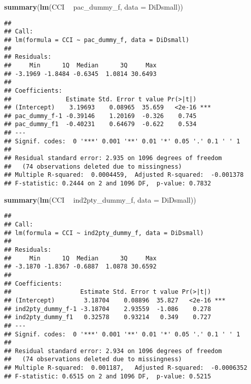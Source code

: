 \documentclass[]{article}
\newenvironment{Shaded}{\begin{snugshade}}{\end{snugshade}}
\newcommand{\KeywordTok}[1]{\textcolor[rgb]{0.13,0.29,0.53}{\textbf{#1}}}
\newcommand{\DataTypeTok}[1]{\textcolor[rgb]{0.13,0.29,0.53}{#1}}
\newcommand{\StringTok}[1]{\textcolor[rgb]{0.31,0.60,0.02}{#1}}
\newcommand{\OperatorTok}[1]{\textcolor[rgb]{0.81,0.36,0.00}{\textbf{#1}}}
\newcommand{\NormalTok}[1]{#1}
\begin{document}
\begin{Shaded}
\begin{Highlighting}[]
\KeywordTok{summary}\NormalTok{(}\KeywordTok{lm}\NormalTok{(CCI }\OperatorTok{~}\StringTok{ }\NormalTok{pac_dummy_f, }\DataTypeTok{data =}\NormalTok{ DiDsmall))}
\end{Highlighting}
\end{Shaded}

\begin{verbatim}
## 
## Call:
## lm(formula = CCI ~ pac_dummy_f, data = DiDsmall)
## 
## Residuals:
##     Min      1Q  Median      3Q     Max 
## -3.1969 -1.8484 -0.6345  1.0814 30.6493 
## 
## Coefficients:
##               Estimate Std. Error t value Pr(>|t|)    
## (Intercept)    3.19693    0.08965  35.659   <2e-16 ***
## pac_dummy_f-1 -0.39146    1.20169  -0.326    0.745    
## pac_dummy_f1  -0.40231    0.64679  -0.622    0.534    
## ---
## Signif. codes:  0 '***' 0.001 '**' 0.01 '*' 0.05 '.' 0.1 ' ' 1
## 
## Residual standard error: 2.935 on 1096 degrees of freedom
##   (74 observations deleted due to missingness)
## Multiple R-squared:  0.0004459,  Adjusted R-squared:  -0.001378 
## F-statistic: 0.2444 on 2 and 1096 DF,  p-value: 0.7832
\end{verbatim}

\begin{Shaded}
\begin{Highlighting}[]
\KeywordTok{summary}\NormalTok{(}\KeywordTok{lm}\NormalTok{(CCI }\OperatorTok{~}\StringTok{ }\NormalTok{ind2pty_dummy_f, }\DataTypeTok{data =}\NormalTok{ DiDsmall))}
\end{Highlighting}
\end{Shaded}

\begin{verbatim}
## 
## Call:
## lm(formula = CCI ~ ind2pty_dummy_f, data = DiDsmall)
## 
## Residuals:
##     Min      1Q  Median      3Q     Max 
## -3.1870 -1.8367 -0.6887  1.0878 30.6592 
## 
## Coefficients:
##                   Estimate Std. Error t value Pr(>|t|)    
## (Intercept)        3.18704    0.08896  35.827   <2e-16 ***
## ind2pty_dummy_f-1 -3.18704    2.93559  -1.086    0.278    
## ind2pty_dummy_f1   0.32578    0.93214   0.349    0.727    
## ---
## Signif. codes:  0 '***' 0.001 '**' 0.01 '*' 0.05 '.' 0.1 ' ' 1
## 
## Residual standard error: 2.934 on 1096 degrees of freedom
##   (74 observations deleted due to missingness)
## Multiple R-squared:  0.001187,   Adjusted R-squared:  -0.0006352 
## F-statistic: 0.6515 on 2 and 1096 DF,  p-value: 0.5215
\end{verbatim}
\end{document}
